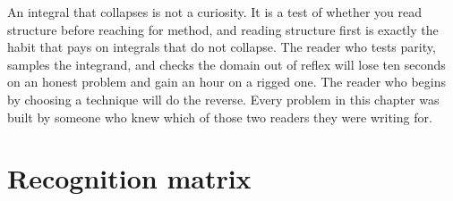 \begin{keynote}
An integral that collapses is not a curiosity. It is a test of whether you read structure before reaching for method, and reading structure first is exactly the habit that pays on integrals that do not collapse. The reader who tests parity, samples the integrand, and checks the domain out of reflex will lose ten seconds on an honest problem and gain an hour on a rigged one. The reader who begins by choosing a technique will do the reverse. Every problem in this chapter was built by someone who knew which of those two readers they were writing for.
\end{keynote}

\section{Recognition matrix}
